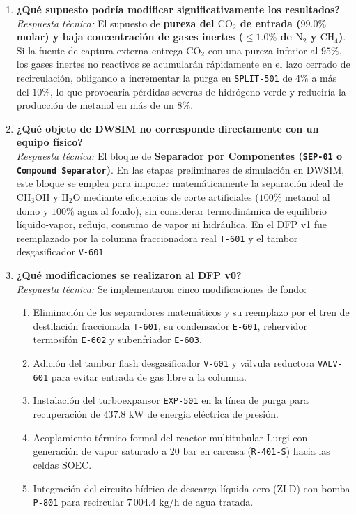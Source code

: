 \documentclass[10pt,letterpaper]{article}
\begin{document}
\begin{enumerate}[leftmargin=*,itemsep=7pt]
    \item \textbf{¿Qué supuesto podría modificar significativamente los resultados?}\\
    \textit{Respuesta técnica:} El supuesto de \textbf{pureza del $\text{CO}_2$ de entrada ($99.0\%$ molar) y baja concentración de gases inertes ($\le 1.0\%$ de $\text{N}_2$ y $\text{CH}_4$)}. Si la fuente de captura externa entrega $\text{CO}_2$ con una pureza inferior al $95\%$, los gases inertes no reactivos se acumularán rápidamente en el lazo cerrado de recirculación, obligando a incrementar la purga en \texttt{SPLIT-501} de $4\%$ a más del $10\%$, lo que provocaría pérdidas severas de hidrógeno verde y reduciría la producción de metanol en más de un $8\%$.

    \item \textbf{¿Qué objeto de DWSIM no corresponde directamente con un equipo físico?}\\
    \textit{Respuesta técnica:} El bloque de \textbf{Separador por Componentes (\texttt{SEP-01} o \texttt{Compound Separator})}. En las etapas preliminares de simulación en DWSIM, este bloque se emplea para imponer matemáticamente la separación ideal de $\text{CH}_3\text{OH}$ y $\text{H}_2\text{O}$ mediante eficiencias de corte artificiales ($100\%$ metanol al domo y $100\%$ agua al fondo), sin considerar termodinámica de equilibrio líquido-vapor, reflujo, consumo de vapor ni hidráulica. En el DFP v1 fue reemplazado por la columna fraccionadora real \texttt{T-601} y el tambor desgasificador \texttt{V-601}.

    \item \textbf{¿Qué modificaciones se realizaron al DFP v0?}\\
    \textit{Respuesta técnica:} Se implementaron cinco modificaciones de fondo:
    \begin{enumerate}
        \item Eliminación de los separadores matemáticos y su reemplazo por el tren de destilación fraccionada \texttt{T-601}, su condensador \texttt{E-601}, rehervidor termosifón \texttt{E-602} y subenfriador \texttt{E-603}.
        \item Adición del tambor flash desgasificador \texttt{V-601} y válvula reductora \texttt{VALV-601} para evitar entrada de gas libre a la columna.
        \item Instalación del turboexpansor \texttt{EXP-501} en la línea de purga para recuperación de $437.8\text{ kW}$ de energía eléctrica de presión.
        \item Acoplamiento térmico formal del reactor multitubular Lurgi con generación de vapor saturado a $20\text{ bar}$ en carcasa (\texttt{R-401-S}) hacia las celdas SOEC.
        \item Integración del circuito hídrico de descarga líquida cero (ZLD) con bomba \texttt{P-801} para recircular $7\,004.4\text{ kg/h}$ de agua tratada.
    \end{enumerate}


\end{enumerate}
\end{document}
